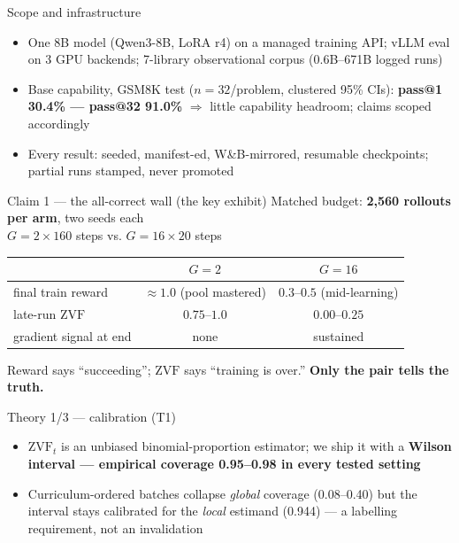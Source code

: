 \documentclass[11pt,aspectratio=169]{beamer}
\newcommand{\ZVF}{\ensuremath{\mathrm{ZVF}}}
\begin{document}
\begin{frame}{Scope and infrastructure}
\begin{itemize}
  \item One 8B model (Qwen3-8B, LoRA r4) on a managed training API;
        vLLM eval on 3 GPU backends; 7-library observational corpus
        (0.6B–671B logged runs)
  \item Base capability, GSM8K test ($n{=}32$/problem, clustered 95\% CIs):
        \textbf{pass@1 30.4\% — pass@32 91.0\%} $\Rightarrow$ little
        capability headroom; claims scoped accordingly
  \item Every result: seeded, manifest-ed, W\&B-mirrored, resumable
        checkpoints; partial runs stamped, never promoted
\end{itemize}
\end{frame}

\begin{frame}{Claim 1 — the all-correct wall (the key exhibit)}
Matched budget: \textbf{2{,}560 rollouts per arm}, two seeds each\\
$G{=}2\times160$ steps \quad vs. \quad $G{=}16\times20$ steps
\begin{center}
\begin{tabular}{@{}lcc@{}}
\toprule
 & $G{=}2$ & $G{=}16$\\
\midrule
final train reward & $\approx 1.0$ (pool mastered) & $0.3$–$0.5$ (mid-learning)\\
late-run \ZVF{} & \alert{$0.75$–$1.0$} & $0.00$–$0.25$\\
gradient signal at end & \alert{none} & sustained\\
\bottomrule
\end{tabular}
\end{center}
\medskip
Reward says ``succeeding''; \ZVF{} says ``training is over.''
\textbf{Only the pair tells the truth.}
\end{frame}

\begin{frame}{Theory 1/3 — calibration (T1)}
\begin{itemize}
  \item $\ZVF_t$ is an unbiased binomial-proportion estimator; we ship it
        with a \textbf{Wilson interval — empirical coverage 0.95–0.98 in
        every tested setting}
  \item Curriculum-ordered batches collapse \emph{global} coverage
        (0.08–0.40) but the interval stays calibrated for the
        \emph{local} estimand (0.944) — a labelling requirement,
        not an invalidation
\end{itemize}
\end{frame}
\end{document}
